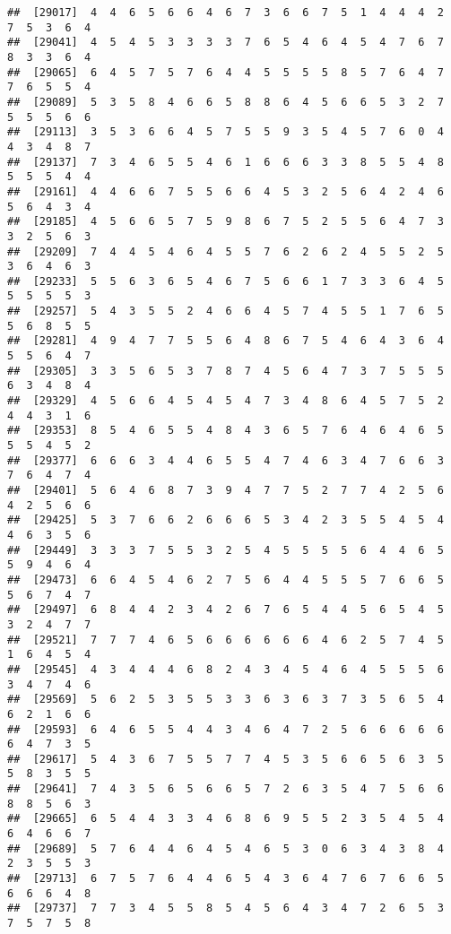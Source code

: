 \documentclass[
]{book}
\begin{document}
\begin{verbatim}
##  [29017]  4  4  6  5  6  6  4  6  7  3  6  6  7  5  1  4  4  4  2  7  5  3  6  4
##  [29041]  4  5  4  5  3  3  3  3  7  6  5  4  6  4  5  4  7  6  7  8  3  3  6  4
##  [29065]  6  4  5  7  5  7  6  4  4  5  5  5  5  8  5  7  6  4  7  7  6  5  5  4
##  [29089]  5  3  5  8  4  6  6  5  8  8  6  4  5  6  6  5  3  2  7  5  5  5  6  6
##  [29113]  3  5  3  6  6  4  5  7  5  5  9  3  5  4  5  7  6  0  4  4  3  4  8  7
##  [29137]  7  3  4  6  5  5  4  6  1  6  6  6  3  3  8  5  5  4  8  5  5  5  4  4
##  [29161]  4  4  6  6  7  5  5  6  6  4  5  3  2  5  6  4  2  4  6  5  6  4  3  4
##  [29185]  4  5  6  6  5  7  5  9  8  6  7  5  2  5  5  6  4  7  3  3  2  5  6  3
##  [29209]  7  4  4  5  4  6  4  5  5  7  6  2  6  2  4  5  5  2  5  3  6  4  6  3
##  [29233]  5  5  6  3  6  5  4  6  7  5  6  6  1  7  3  3  6  4  5  5  5  5  5  3
##  [29257]  5  4  3  5  5  2  4  6  6  4  5  7  4  5  5  1  7  6  5  5  6  8  5  5
##  [29281]  4  9  4  7  7  5  5  6  4  8  6  7  5  4  6  4  3  6  4  5  5  6  4  7
##  [29305]  3  3  5  6  5  3  7  8  7  4  5  6  4  7  3  7  5  5  5  6  3  4  8  4
##  [29329]  4  5  6  6  4  5  4  5  4  7  3  4  8  6  4  5  7  5  2  4  4  3  1  6
##  [29353]  8  5  4  6  5  5  4  8  4  3  6  5  7  6  4  6  4  6  5  5  5  4  5  2
##  [29377]  6  6  6  3  4  4  6  5  5  4  7  4  6  3  4  7  6  6  3  7  6  4  7  4
##  [29401]  5  6  4  6  8  7  3  9  4  7  7  5  2  7  7  4  2  5  6  4  2  5  6  6
##  [29425]  5  3  7  6  6  2  6  6  6  5  3  4  2  3  5  5  4  5  4  4  6  3  5  6
##  [29449]  3  3  3  7  5  5  3  2  5  4  5  5  5  5  6  4  4  6  5  5  9  4  6  4
##  [29473]  6  6  4  5  4  6  2  7  5  6  4  4  5  5  5  7  6  6  5  5  6  7  4  7
##  [29497]  6  8  4  4  2  3  4  2  6  7  6  5  4  4  5  6  5  4  5  3  2  4  7  7
##  [29521]  7  7  7  4  6  5  6  6  6  6  6  6  4  6  2  5  7  4  5  1  6  4  5  4
##  [29545]  4  3  4  4  4  6  8  2  4  3  4  5  4  6  4  5  5  5  6  3  4  7  4  6
##  [29569]  5  6  2  5  3  5  5  3  3  6  3  6  3  7  3  5  6  5  4  6  2  1  6  6
##  [29593]  6  4  6  5  5  4  4  3  4  6  4  7  2  5  6  6  6  6  6  6  4  7  3  5
##  [29617]  5  4  3  6  7  5  5  7  7  4  5  3  5  6  6  5  6  3  5  5  8  3  5  5
##  [29641]  7  4  3  5  6  5  6  6  5  7  2  6  3  5  4  7  5  6  6  8  8  5  6  3
##  [29665]  6  5  4  4  3  3  4  6  8  6  9  5  5  2  3  5  4  5  4  6  4  6  6  7
##  [29689]  5  7  6  4  4  6  4  5  4  6  5  3  0  6  3  4  3  8  4  2  3  5  5  3
##  [29713]  6  7  5  7  6  4  4  6  5  4  3  6  4  7  6  7  6  6  5  6  6  6  4  8
##  [29737]  7  7  3  4  5  5  8  5  4  5  6  4  3  4  7  2  6  5  3  7  5  7  5  8

\end{verbatim}
\end{document}
